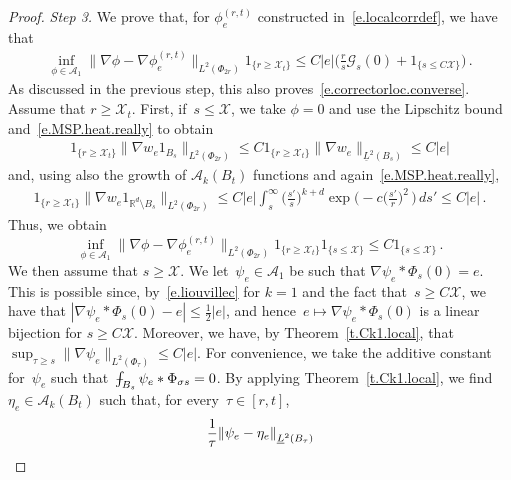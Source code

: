 \documentclass[11pt]{article} %
\numberwithin{equation}{section}
\theoremstyle{definition}
\let\originalleft\left
\let\originalright\right
\renewcommand{\left}{\mathopen{}\mathclose\bgroup\originalleft}
\renewcommand{\right}{\aftergroup\egroup\originalright}
\newcommand*{\R}{\ensuremath{\mathbb{R}}}
\newcommand{\X}{\mathcal{X}}
\newcommand{\indc}{1}
\def\Xint#1{\mathchoice
{\XXint\displaystyle\textstyle{#1}}%
{\XXint\textstyle\scriptstyle{#1}}%
{\XXint\scriptstyle\scriptscriptstyle{#1}}%
{\XXint\scriptscriptstyle\scriptscriptstyle{#1}}%
\!\int}
\def\XXint#1#2#3{{\setbox0=\hbox{$#1{#2#3}{\int}$}
\vcenter{\hbox{$#2#3$}}\kern-.5\wd0}}
\def\fint{\Xint-}
\newcommand{\A}{\mathcal{A}}
\begin{document}
\begin{proof}
\emph{Step 3.} We prove that,  for $\phi_{e}^{(r,t)}$ constructed in~\eqref{e.localcorrdef}, we have that 
\begin{align}  \label{e.correctorloc}
\inf_{\phi \in \A_1 }
\big\| \nabla \phi - \nabla \phi_{e}^{(r,t)}\big\|_{L^2(\Phi_{2r})}
\indc_{\{ r \geq \X_t \}} %
\leq 
C |e| 
\biggl( 
 \frac{r}{s} \mathcal{G}_{s}(0) 
+
 \indc_{\{ s \leq C \X \}}
\biggr) 
\,.
\end{align}
As discussed in the previous step, this also proves~\eqref{e.correctorloc.converse}.  Assume that $r \geq  \X_t$. First, if~$s\leq \X$, we take $\phi = 0$ and use the Lipschitz bound and~\eqref{e.MSP.heat.really} to obtain 
\begin{align*}  
\indc_{\{ r \geq \X_t \}} \big\| \nabla w_{e} \indc_{B_s} \big\|_{L^2(\Phi_{2r})} 
\leq 
C \indc_{\{ r \geq \X_t \}} \big\| \nabla w_{e}  \big\|_{\underline{L}^2(B_s)} 
\leq
C |e| 
\end{align*}
and, using also the growth of $\A_k(B_t)$ functions and again~\eqref{e.MSP.heat.really}, 
\begin{align*}  
\indc_{\{ r \geq \X_t \}} \big\| \nabla w_{e}  \indc_{\R^d \setminus B_s} \big\|_{L^2(\Phi_{2r})} 
\leq 
C |e| \int_{s}^\infty \biggl(\frac{s'}{s} \biggr)^{\!\!k+d} \exp\biggl( - c  \biggl( \frac{s'}{r} \biggr)^{\!\!2} \, \biggr) \, ds'  
\leq 
C|e| 
\,.
\end{align*}
Thus, we obtain 
\begin{equation*}  
\inf_{\phi \in \A_1 }
\big\| \nabla \phi - \nabla \phi_{e}^{(r,t)}\big\|_{L^2(\Phi_{2r})}
\indc_{\{ r \geq \X_t \}} \indc_{\{ s \leq \X \}} 
\leq 
C
\indc_{\{ s \leq \X \}} 
\,.
\end{equation*}
We then assume that $s\geq \X$. We let~$\psi_e \in \A_1$ be such that $\nabla \psi_e \ast  \Phi_s (0)  = e$. This is possible since, by~\eqref{e.liouvillec} for $k=1$ and the fact that~$s \geq C\X$, we have that $|\nabla \psi_e \ast  \Phi_s (0) - e| \leq \frac12 |e|$, and hence~$e \mapsto \nabla \psi_e \ast  \Phi_s (0)$ is a linear bijection for $s\geq C\X$. Moreover, we have, by Theorem~\ref{t.Ck1.local}, that $\sup_{\tau \geq s} \| \nabla \psi_e \|_{L^2(\Phi_\tau)} \leq C|e|$. For convenience, we take the additive constant for~$\psi_e$ such that~$\fint_{B_s} \psi_e\ast \Phi_{\sigma s} = 0$. By applying Theorem~\ref{t.Ck1.local}, 
we find~$\eta_e \in  \A_{k}(B_t)$ such that, for every~$\tau  \in [r,t]$, 
\begin{align} \label{e.loc.corrclose2}
\frac1\tau \left\|  \psi_e -  \eta_e \right\|_{\underline{L}^2 \left( B_{\tau} \right)} 

\end{align}
\end{proof}
\end{document}
